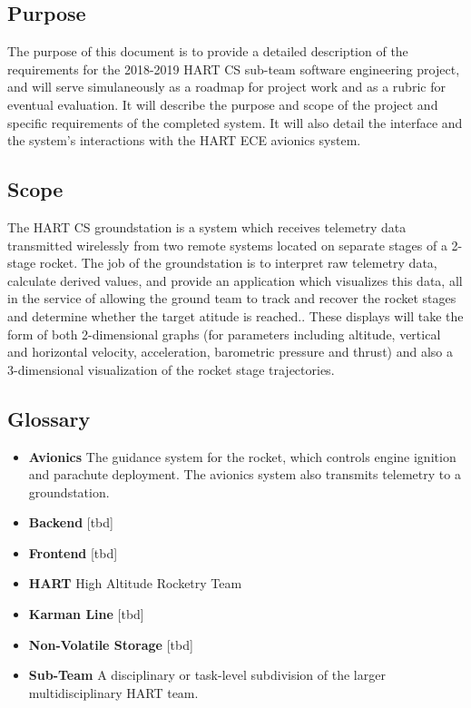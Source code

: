\documentclass[onecolumn, draftclsnofoot,10pt, compsoc]{IEEEtran}
\begin{document}
		\subsection{Purpose}
			The purpose of this document is to provide a detailed description of the requirements for the 2018-2019 HART CS sub-team software engineering project, and will serve simulaneously as a roadmap for project work and as a rubric for eventual evaluation. 
			It will describe the purpose and scope of the project and specific requirements of the completed system. 
			It will also detail the interface and the system's interactions with the HART ECE avionics system.

		\subsection{Scope}
			The HART CS groundstation is a system which receives telemetry data transmitted wirelessly from two remote systems located on separate stages of a 2-stage rocket. 
			The job of the groundstation is to interpret raw telemetry data, calculate derived values, and provide an application which visualizes this data, all in the service of allowing the ground team to track and recover the rocket stages and determine whether the target atitude is reached..
			These displays will take the form of both 2-dimensional graphs (for parameters including altitude, vertical and horizontal velocity, acceleration, barometric pressure and thrust) and also a 3-dimensional visualization of the rocket stage trajectories.

		\subsection{Glossary}
			\begin{itemize}
				\item \textbf{Avionics}
					The guidance system for the rocket, which controls engine ignition and parachute deployment.
					The avionics system also transmits telemetry to a groundstation.
				\item \textbf{Backend}
					[tbd]
				\item \textbf{Frontend}
					[tbd]
				\item \textbf{HART}
					High Altitude Rocketry Team
				\item \textbf{Karman Line}
					[tbd]
				\item \textbf{Non-Volatile Storage}
					[tbd]
				\item \textbf{Sub-Team}
					A disciplinary or task-level subdivision of the larger multidisciplinary HART team.

			\end{itemize}
\end{document}
